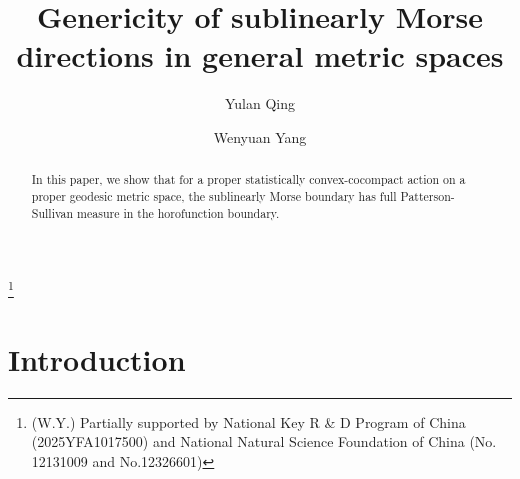 \documentclass{amsart}
\theoremstyle{definition}
\theoremstyle{remark}
\begin{document}
\title[Genericity of sublinearly Morse directions]{Genericity of sublinearly Morse directions in general metric spaces}

\author{Yulan Qing}
\address{Department of Mathematics\\
University of Tennessee at Knoxville\\
1403 Circle Drive, Knoxville, TN 37916, USA}

\author{Wenyuan Yang}

\address{Beijing International Center for Mathematical Research\\
Peking University\\
 Beijing 100871, China
P.R.}
\thanks{(W.Y.) Partially supported by National Key R \& D Program of China (2025YFA1017500) and  National Natural Science Foundation of China (No. 12131009 and No.12326601)}




\dedicatory{}

\keywords{}

\begin{abstract}
In this paper, we show that for a proper statistically convex-cocompact action on a proper geodesic metric space,  the sublinearly Morse boundary has full Patterson-Sullivan measure in the horofunction boundary.  

\end{abstract}

\maketitle
\setcounter{tocdepth}{2} \tableofcontents


\section{Introduction}
\end{document}
